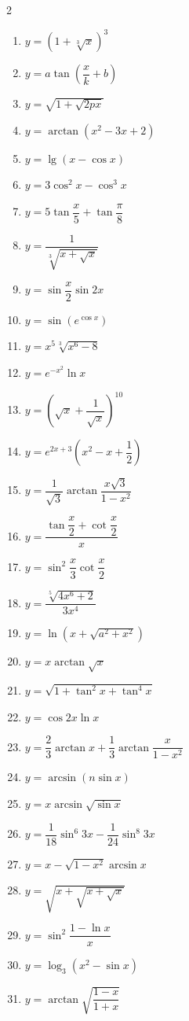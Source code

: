 \begin{multicols}{2}
\begin{enumerate}
  \item $y = (1 + \sqrt[3]{x})^3$
  \item $y = a \tan\!\left(\dfrac{x}{k} + b\right)$
  \item $y = \sqrt{1 + \sqrt{2px}}$
  \item $y = \arctan(x^2 - 3x + 2)$
  \item $y = \lg(x - \cos x)$
  \item $y = 3\cos^2 x - \cos^3 x$
  \item $y = 5\tan\dfrac{x}{5} + \tan\dfrac{\pi}{8}$
  \item $y = \dfrac{1}{\sqrt[3]{x + \sqrt{x}}}$
  \item $y = \sin\dfrac{x}{2}\sin2x$
  \item $y = \sin(e^{\cos x})$
  \item $y = x^5\sqrt[3]{x^6 - 8}$
  \item $y = e^{-x^2}\ln x$
  \item $y = \left(\sqrt{x} + \dfrac{1}{\sqrt{x}}\right)^{10}$
  \item $y = e^{2x+3}\!\left(x^2 - x + \dfrac{1}{2}\right)$
  \item $y = \dfrac{1}{\sqrt{3}}\arctan\dfrac{x\sqrt{3}}{1 - x^2}$
  \item $y = \dfrac{\tan\dfrac{x}{2} + \cot\dfrac{x}{2}}{x}$
  \item $y = \sin^2\dfrac{x}{3}\cot\dfrac{x}{2}$
  \item $y = \dfrac{\sqrt[5]{4x^6 + 2}}{3x^4}$
  \item $y = \ln\!\left(x + \sqrt{a^2 + x^2}\right)$
  \item $y = x \arctan\sqrt{x}$
  \item $y = \sqrt{1 + \tan^2 x + \tan^4 x}$
  \item $y = \cos2x\ln x$
  \item $y = \dfrac{2}{3}\arctan x + \dfrac{1}{3}\arctan\dfrac{x}{1 - x^2}$
  \item $y = \arcsin(n\sin x)$
  \item $y = x\arcsin\sqrt{\sin x}$
  \item $y = \dfrac{1}{18}\sin^6 3x - \dfrac{1}{24}\sin^8 3x$
  \item $y = x - \sqrt{1 - x^2}\arcsin x$
  \item $y = \sqrt{x + \sqrt{x + \sqrt{x}}}$
  \item $y = \sin^2\dfrac{1 - \ln x}{x}$
  \item $y = \log_3(x^2 - \sin x)$
  \item $y = \arctan\sqrt{\dfrac{1 - x}{1 + x}}$

\end{enumerate}
\end{multicols}
